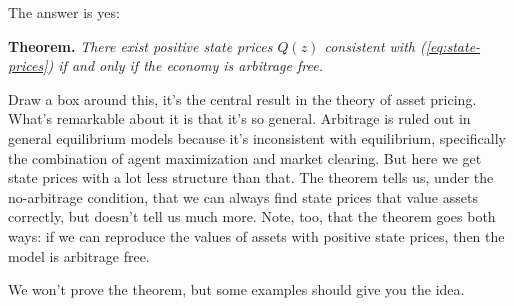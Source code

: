 \documentclass[11pt]{article}
\begin{document}
The answer is yes:

{\bf Theorem.\/}  {\it There exist positive state prices $Q(z)$
consistent with (\ref{eq:state-prices})
if and only if the economy is arbitrage free.\/}

Draw a box around this, it's the central result in the theory of asset pricing.
What's remarkable about it is that it's so general.
Arbitrage is ruled out in general equilibrium models
because it's inconsistent with equilibrium,
specifically the combination of agent maximization and market clearing.
But here we get state prices with a lot less structure than that.
The theorem tells us, under the no-arbitrage condition,
that we can always find state prices that value assets
correctly, but doesn't tell us much more.
Note, too, that the theorem goes both ways:
if we can reproduce the values of assets with positive state prices,
then the model is arbitrage free.

We won't prove the theorem, but some examples should give you the idea.
\end{document}

